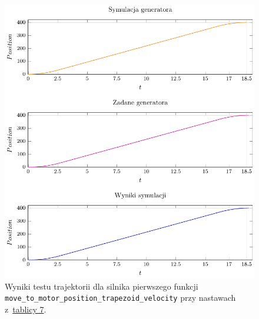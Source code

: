 \documentclass[a4paper, 12pt]{article}
\begin{document}
	\begin{figure}[H]
		\centering
		\includegraphics[scale=1.2]{raport_graphs/simpMPV.pdf}
		\caption{Wyniki testu trajektorii dla silnika pierwszego funkcji \texttt{move\_to\_motor\_position\_trapezoid\_velocity} przy nastawach z~\hyperref[tab:setup1]{tablicy 7}.}
		\label{fig:simpMPV}
	\end{figure}
\end{document}
